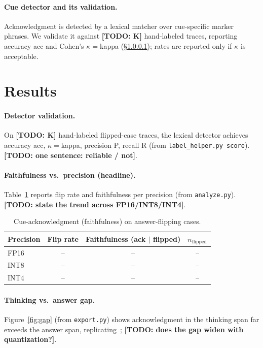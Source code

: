 \documentclass[11pt]{article}
\newcommand{\todo}[1]{{\color{red}\textbf{[TODO: #1]}}}
\newcommand{\res}[1]{{\color{blue}#1}} %
\begin{document}
\paragraph{Cue detector and its validation.}
Acknowledgment is detected by a lexical matcher over cue-specific marker phrases.
We validate it against \todo{K} hand-labeled traces, reporting accuracy
\res{acc} and Cohen's $\kappa=$\res{kappa} (\S\ref{sec:validation}); rates are
reported only if $\kappa$ is acceptable.

\section{Results}
\paragraph{Detector validation.}\label{sec:validation}
On \todo{K} hand-labeled flipped-case traces, the lexical detector achieves
accuracy \res{acc}, $\kappa=$\res{kappa}, precision \res{P}, recall \res{R}
(from \texttt{label\_helper.py score}). \todo{one sentence: reliable / not}.

\paragraph{Faithfulness vs.\ precision (headline).}
Table~\ref{tab:headline} reports flip rate and faithfulness per precision
(from \texttt{analyze.py}). \todo{state the trend across FP16/INT8/INT4}.

\begin{table}[h]\centering
\caption{Cue-acknowledgment (faithfulness) on answer-flipping cases.}
\label{tab:headline}
\begin{tabular}{lccc}
\toprule
Precision & Flip rate & Faithfulness (ack $\mid$ flipped) & $n_{\text{flipped}}$ \\
\midrule
FP16 & \res{--} & \res{--} & \res{--} \\
INT8 & \res{--} & \res{--} & \res{--} \\
INT4 & \res{--} & \res{--} & \res{--} \\
\bottomrule
\end{tabular}
\end{table}

\paragraph{Thinking vs.\ answer gap.}
Figure~\ref{fig:gap} (from \texttt{export.py}) shows acknowledgment in the
thinking span far exceeds the answer span, replicating~\cite{whymodelsknow2026};
\todo{does the gap widen with quantization?}.
\end{document}

